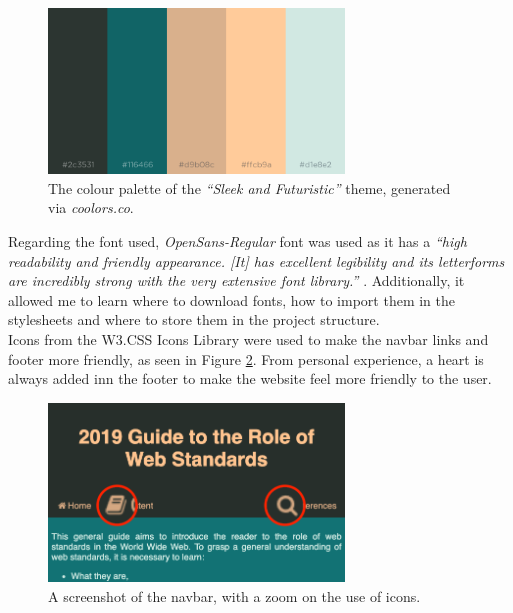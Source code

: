 \documentclass[letterpaper,12pt]{article}
\begin{document}
\begin{figure}[h] 
\centerline{\includegraphics[width=0.7\textwidth]{report/images/colour-palette.png}}
\caption{\label{fig:colour-palette}The colour palette of the \textit{``Sleek and Futuristic''} theme, generated via \textit{coolors.co}.}
\end{figure}

Regarding the font used, \textit{OpenSans-Regular} font was used as it has a \textit{``high readability and friendly appearance. [It] has excellent legibility and its letterforms are incredibly strong with the very extensive font library.''} \cite{open-sans-font}. Additionally, it allowed me to learn where to download fonts, how to import them in the stylesheets and where to store them in the project structure.\\

Icons from the W3.CSS Icons Library \cite{w3-css-icons} were used to make the navbar links and footer more friendly, as seen in Figure \ref{fig:navbar-icons}. From personal experience, a heart is always added inn the footer to make the website feel more friendly to the user.

\begin{figure}[h] 
\centerline{\includegraphics[width=0.7\textwidth]{report/images/navbar-icons.png}}
\caption{\label{fig:navbar-icons}A screenshot of the navbar, with a zoom on the use of icons.}
\end{figure}
\end{document}
